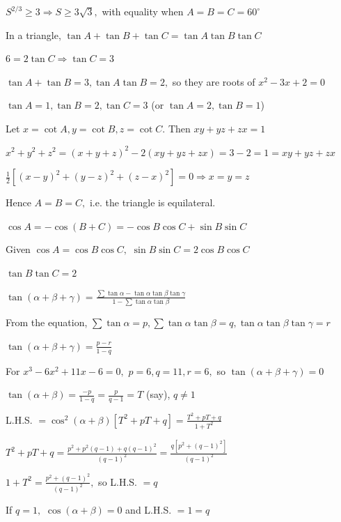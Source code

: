   $S^{2/3} \geq 3 \Rightarrow S \geq 3\sqrt{3},$ with equality when $A = B = C = 60^\circ$

\item In a triangle, $\tan A + \tan B + \tan C = \tan A\tan B\tan C$

  $6 = 2\tan C \Rightarrow \tan C = 3$

  $\tan A + \tan B = 3, \tan A\tan B = 2,$ so they are roots of $x^2 - 3x + 2 = 0$

  $\tan A = 1, \tan B = 2, \tan C = 3$ (or $\tan A = 2, \tan B = 1$)

\item Let $x = \cot A, y = \cot B, z = \cot C.$ Then $xy + yz + zx = 1$

  $x^2 + y^2 + z^2 = (x + y + z)^2 - 2(xy + yz + zx) = 3 - 2 = 1 = xy + yz + zx$

  $\frac{1}{2}[(x - y)^2 + (y - z)^2 + (z - x)^2] = 0 \Rightarrow x = y = z$

  Hence $A = B = C,$ i.e. the triangle is equilateral.

\item $\cos A = -\cos(B + C) = -\cos B\cos C + \sin B\sin C$

  Given $\cos A = \cos B\cos C,$ $\sin B\sin C = 2\cos B\cos C$

  $\tan B\tan C = 2$

\item $\tan(\alpha + \beta + \gamma) = \frac{\sum\tan\alpha - \tan\alpha\tan\beta\tan\gamma}{1 - \sum\tan\alpha\tan\beta}$

  From the equation, $\sum\tan\alpha = p, \sum\tan\alpha\tan\beta = q, \tan\alpha\tan\beta\tan\gamma = r$

  $\tan(\alpha + \beta + \gamma) = \frac{p - r}{1 - q}$

  For $x^3 - 6x^2 + 11x - 6 = 0,$ $p = 6, q = 11, r = 6,$ so $\tan(\alpha + \beta + \gamma) = 0$

\item $\tan(\alpha + \beta) = \frac{-p}{1 - q} = \frac{p}{q - 1} = T$ (say), $q \neq 1$

  L.H.S. $= \cos^2(\alpha + \beta)[T^2 + pT + q] = \frac{T^2 + pT + q}{1 + T^2}$

  $T^2 + pT + q = \frac{p^2 + p^2(q - 1) + q(q - 1)^2}{(q - 1)^2} = \frac{q[p^2 + (q - 1)^2]}{(q - 1)^2}$

  $1 + T^2 = \frac{p^2 + (q - 1)^2}{(q - 1)^2},$ so L.H.S. $= q$

  If $q = 1,$ $\cos(\alpha + \beta) = 0$ and L.H.S. $= 1 = q$

